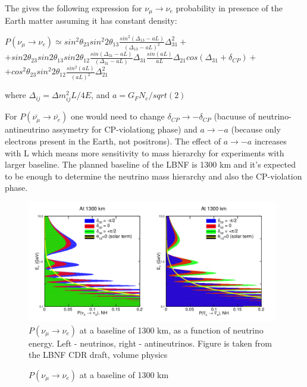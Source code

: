 The \cite{ref_LBNFdoc_volume-physics} gives the following expression for $\nu_\mu \rightarrow \nu_e$ probability in presence of the Earth matter assuming it has constant density: \\
\begin{center}
$P(\nu_\mu \rightarrow \nu_e) \simeq sin^2{\theta_{23}}sin^2{2\theta_{13}}\frac{sin^2(\Delta_{13}-aL)}{(\Delta_{13}-aL)^2}\Delta^2_{31}+$\\
$+sin2\theta_{23}sin2\theta_{13}sin2\theta_{12}\frac{sin(\Delta_{31}-aL)}{(\Delta_{31}-aL)}\Delta_{31}\frac{sin(aL)}{aL}\Delta_{21}cos(\Delta_{31}+\delta_{CP})+$\\
$+cos^2\theta_{23}sin^2{2\theta_{12}}\frac{sin^2(aL)}{(aL)^2}\Delta^2_{21}$\\
\end{center}
\begin{center}
where $\Delta_{ij}={\Delta}m^2_{ij}L/4E$, and $a={G_F}{N_e}/sqrt(2)$\\
\end{center}

For $P(\bar{\nu_\mu} \rightarrow \bar{\nu_e})$ one would need to change $\delta_{CP} \rightarrow -\delta_{CP}$ (bacuuse of neutrino-antineutrino assymetry for CP-violationg phase) and $a \rightarrow -a$ (because only electrons present in the Earth, not positrons). The effect of $a \rightarrow -a$ increases with L which means more sensitivity to mass hierarchy for experiments with larger baseline. The planned baseline of the LBNF is 1300 km and it's expected to be enough to determine the neutrino mass hierarchy and also the CP-violation phase.

\begin{figure}
\caption{$P(\nu_\mu \rightarrow \nu_e)$ at a baseline of 1300 km}
\label{fig:LBNF_oscProbability}
\centering
\includegraphics[width=0.98\textwidth, keepaspectratio=true]{figs/LBNF_oscProbability.png}
\\$P(\nu_\mu \rightarrow \nu_e)$ at a baseline of 1300 km, as a function of neutrino energy. Left - neutrinos, right - antineutrinos. Figure is taken from the LBNF CDR draft, volume physics\cite{ref_LBNFdoc_volume-physics}
\end{figure}

